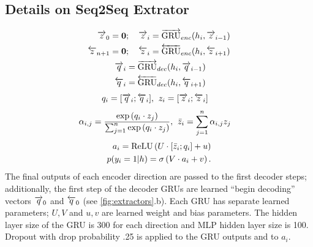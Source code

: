 \subsection{Details on Seq2Seq Extrator} \label{app:s2sextractor}
\begin{align}
    \rEncExtHidden_0 = \textbf{0}&;\quad \rEncExtHidden_i = \rgru_{enc}(\sentEmb[i], \rEncExtHidden_{i-1}) \\
    \lEncExtHidden_{\docSize + 1} = \textbf{0}&;\quad  \lEncExtHidden_i = \lgru_{enc}(\sentEmb[i], \lEncExtHidden_{i+1}) \\
    \rDecExtHidden_i &= \rgru_{dec}(\sentEmb[i], \rDecExtHidden_{i-1}) \\
    \lDecExtHidden_i &= \lgru_{dec}(\sentEmb[i], \lDecExtHidden_{i+1}) 
\end{align}
\begin{align}
 q_i = [\overrightarrow{q}_i; \overleftarrow{q}_i], &\;\;
 z_i = [\overrightarrow{z}_i; \overleftarrow{z}_i] 
\end{align}
\begin{align}
 \alpha_{i,j} = 
   \frac{\exp \left(q_i \cdot z_j \right)}{
   \sum_{j=1}^{n}\exp\left(q_i \cdot z_j\right)}, 
& \;\; \bar{z}_i = \sum_{j=1}^{n} \alpha_{i,j} z_j 
\end{align}
\begin{align}
   \logits_i = \relu\left(U \cdot [\attnExtHidden_i; \decExtHidden_i] + u \right)&\\
   p(\slabel_i=1|\sentvec) = \sigma\left(V\cdot \logits_i + v  \right).
\end{align}
The final outputs of each encoder direction are passed to the first decoder
steps; additionally, the first step of the decoder GRUs are learned 
``begin decoding'' vectors $\overrightarrow{q}_0$ and $\overleftarrow{q}_0$ 
(see \autoref{fig:extractors}.b).
Each GRU has separate learned 
parameters; $U, V$ and $u, v$ are learned weight and bias parameters.
The hidden layer size of the GRU is 300 for each direction and MLP hidden layer
size is 100. Dropout with drop probability .25 is applied to the GRU outputs and to $a_i$.

